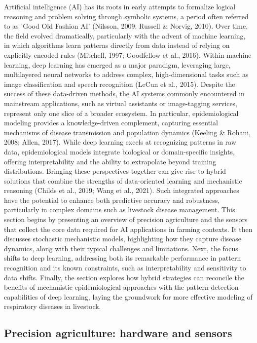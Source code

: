Artificial intelligence (AI) has its roots in early attempts to formalize logical reasoning and problem solving through symbolic systems, a period often referred to as 'Good Old Fashion AI' (Nilsson, 2009; Russell \& Norvig, 2010). Over time, the field evolved dramatically, particularly with the advent of machine learning, in which algorithms learn patterns directly from data instead of relying on explicitly encoded rules (Mitchell, 1997; Goodfellow et al., 2016). Within machine learning, deep learning has emerged as a major paradigm, leveraging large, multilayered neural networks to address complex, high-dimensional tasks such as image classification and speech recognition (LeCun et al., 2015).
Despite the success of these data-driven methods, the AI systems commonly encountered in mainstream applications, such as virtual assistants or image-tagging services, represent only one slice of a broader ecosystem. In particular, epidemiological modeling provides a knowledge-driven complement, capturing essential mechanisms of disease transmission and population dynamics (Keeling \& Rohani, 2008; Allen, 2017). While deep learning excels at recognizing patterns in raw data, epidemiological models integrate biological or domain-specific insights, offering interpretability and the ability to extrapolate beyond training distributions.
Bringing these perspectives together can give rise to hybrid solutions that combine the strengths of data-oriented learning and mechanistic reasoning (Childs et al., 2019; Wang et al., 2021). Such integrated approaches have the potential to enhance both predictive accuracy and robustness, particularly in complex domains such as livestock disease management.
This section begins by presenting an overview of precision agriculture and the sensors that collect the core data required for AI applications in farming contexts. It then discusses stochastic mechanistic models, highlighting how they capture disease dynamics, along with their typical challenges and limitations. Next, the focus shifts to deep learning, addressing both its remarkable performance in pattern recognition and its known constraints, such as interpretability and sensitivity to data shifts. Finally, the section explores how hybrid strategies can reconcile the benefits of mechanistic epidemiological approaches with the pattern-detection capabilities of deep learning, laying the groundwork for more effective modeling of respiratory diseases in livestock.

\subsection{Precision agriculture: hardware and sensors}

